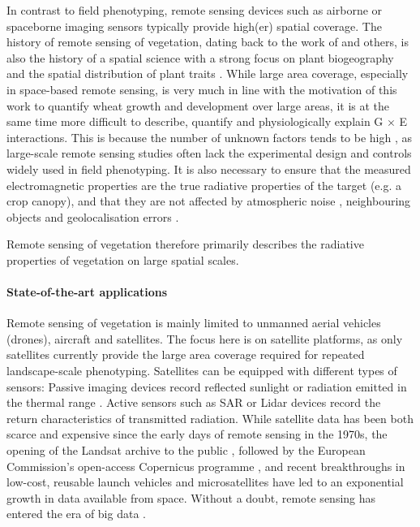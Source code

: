 In contrast to field phenotyping, remote sensing devices such as airborne or spaceborne imaging sensors typically provide high(er) spatial coverage. The history of remote sensing of vegetation, dating back to the work of \cite{rouse_monitoring_1974} and others, is also the history of a spatial science \citep{goodchild_geographical_1992} with a strong focus on plant biogeography and the spatial distribution of plant traits \citep{millington_gis_2001}. While large area coverage, especially in space-based remote sensing, is very much in line with the motivation of this work to quantify wheat growth and development over large areas, it is at the same time more difficult to describe, quantify and physiologically explain G $\times$ E interactions. This is because the number of unknown factors tends to be high \citep{helman_land_2018}, as large-scale remote sensing studies often lack the experimental design and controls widely used in field phenotyping. It is also necessary to ensure that the measured electromagnetic properties are the true radiative properties of the target (e.g. a crop canopy), and that they are not affected by atmospheric noise \citep{eklundh_noise_1995}, neighbouring objects \citep{wang_adaptive_2021} and geolocalisation errors \citep{yan_sentinel-2a_2018}.

Remote sensing of vegetation therefore primarily describes the radiative properties of vegetation on large spatial scales.

\paragraph{State-of-the-art applications}
Remote sensing of vegetation is mainly limited to unmanned aerial vehicles (drones), aircraft and satellites.  The focus here is on satellite platforms, as only satellites currently provide the large area coverage required for repeated landscape-scale phenotyping. Satellites can be equipped with different types of sensors: Passive imaging devices record reflected sunlight or radiation emitted in the thermal range \citep{khanal_overview_2017}. Active sensors such as \gls{SAR} \citep{steele-dunne_radar_2017} or \gls{Lidar} devices \citep{dubayah_gedi_2022} record the return characteristics of transmitted radiation. While satellite data has been both scarce and expensive since the early days of remote sensing in the 1970s, the opening of the Landsat archive to the public \citep{zhu_benefits_2019}, followed by the European Commission's open-access Copernicus programme \citep{harris_open_2015}, and recent breakthroughs in low-cost, reusable launch vehicles \citep{reddy_spacex_2018} and microsatellites \citep{pelton_key_2019} have led to an exponential growth in data available from space. Without a doubt, remote sensing has entered the era of big data \citep{sudmanns_big_2020}.

